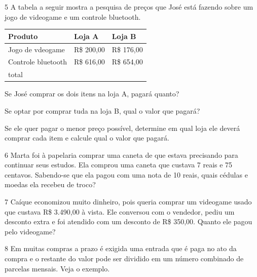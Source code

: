 \num{5} A tabela a seguir mostra a pesquisa de preços que José está fazendo
sobre um jogo de videogame e um controle bluetooth.

\begin{longtable}[]{@{}lll@{}}
\toprule
Produto & Loja A & Loja B\tabularnewline
\midrule
\endhead
Jogo de vdeogame & R\$ 200,00 & R\$ 176,00\tabularnewline
Controle bluetooth & R\$ 616,00 & R\$ 654,00\tabularnewline
total & &\tabularnewline
\bottomrule
\end{longtable}

\begin{escolha}
\item Se José comprar os dois itens na loja A, pagará quanto?

\item Se optar por comprar tuda na loja B, qual o valor que pagará?

\item Se ele quer pagar o menor preço possível, determine em qual loja ele
  deverá comprar cada item e calcule qual o valor que pagará.
\end{escolha}

\num{6} Marta foi à papelaria comprar uma caneta de que estava precisando para
continuar seus estudos. Ela comprou uma caneta que custava 7 reais e 75
centavos. Sabendo-se que ela pagou com uma nota de 10 reais, quais
cédulas e moedas ela recebeu de troco?

\num{7} Caíque economizou muito dinheiro, pois queria comprar um videogame usado
que custava R\$ 3.490,00 à vista. Ele conversou com o vendedor, pediu
um desconto extra e foi atendido com um desconto de R\$ 350,00. Quanto ele pagou pelo videogame?

\num{8} Em muitas compras a prazo é exigida uma entrada que é paga no ato da
compra e o restante do valor pode ser dividido em um número combinado de
parcelas mensais. Veja o exemplo.

